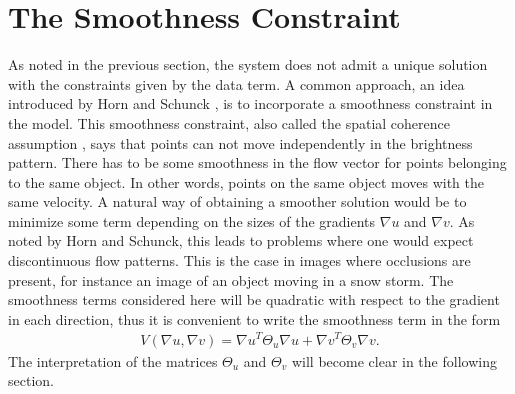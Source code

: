\chapter{The Smoothness Constraint}
As noted in the previous section, the system does not admit a unique solution with the constraints given by the data term. A common approach, an idea introduced by Horn and Schunck \cite{HS}, is to incorporate a smoothness constraint in the model. This smoothness constraint, also called the spatial coherence assumption \cite{Black199675}, says that points can not move independently in the brightness pattern. There has to be some smoothness in the flow vector for points belonging to the same object. In other words, points on the same object moves with the same velocity. A natural way of obtaining a smoother solution would be to minimize some term depending on the sizes of the gradients $\nabla u$ and $\nabla v$. As noted by Horn and Schunck, this leads to problems where one would expect discontinuous flow patterns. This is the case in images where occlusions are present, for instance an image of an object moving in a snow storm. The smoothness terms considered here will be quadratic with respect to the gradient in each direction, thus it is convenient to write the smoothness term in the form
\begin{align}
\label{SmoothnessTerm}
V(\nabla u, \nabla v) = \nabla u ^T \Theta_u \nabla u + \nabla v ^T \Theta_v \nabla v.
\end{align}
The interpretation of the matrices $\Theta_u$ and $\Theta_v$ will become clear in the following section. 